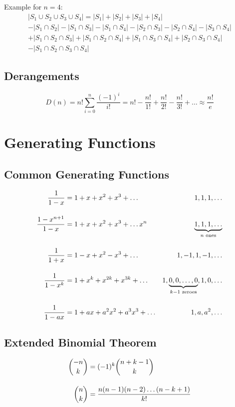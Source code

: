 \documentclass[12pt]{article}
\begin{document}
Example for $n=4:$
\newcommand{\dlist}[1]{S_{#1}}
\begin{multline*}
    |\dlist{1} \cup \dlist{2} \cup \dlist{3} \cup \dlist{4}| = |\dlist{1}| + |\dlist{2}| + |\dlist{3}| + |\dlist{4}|\\ 
    -|\dlist{1} \cap \dlist{2}| - |\dlist{1} \cap \dlist{3}| - |\dlist{1} \cap \dlist{4}| - |\dlist{2} \cap \dlist{3}| - |\dlist{2} \cap \dlist{4}| - |\dlist{3} \cap \dlist{4}|\\
    +|\dlist{1} \cap \dlist{2} \cap \dlist{3}| + |\dlist{1} \cap \dlist{2} \cap \dlist{4}| + |\dlist{1} \cap \dlist{3} \cap \dlist{4}| + |\dlist{2} \cap \dlist{3} \cap \dlist{4}|\\
    -|\dlist{1} \cap \dlist{2} \cap \dlist{3} \cap \dlist{4}|
\end{multline*}
\subsection{Derangements}
\[
    D(n) = n!\sum_{i=0}^n \frac{(-1)^i}{i!} = n! - \frac{n!}{1!} + \frac{n!}{2!} - \frac{n!}{3!} +\ldots \approx \frac{n!}{e}
\]

\pagebreak
\section{Generating Functions}
\subsection{Common Generating Functions}
\begin{equation*}
    \setlength{\jot}{.5cm}
    \begin{aligned}
    \frac{1}{1-x} &= 1 + x + x^2 + x^3 + \ldots & 1, 1, 1, \ldots\\  
    \frac{1-x^{n+1}}{1-x} &= 1 + x + x^2 + x^3 + \ldots x^n & \underbrace{1, 1, 1, \ldots}_{n\text{ ones}}\\
    \frac{1}{1+x} &= 1 - x + x^2 - x^3 + \ldots & 1, -1, 1, -1, \ldots\\  
    \frac{1}{1-x^k} &= 1 + x^k + x^{2k} + x^{3k} + \ldots & 1, \underbrace{0,0,\ldots,0}_{k-1\text{ zeroes}}, 1, 0,\ldots\\
    \frac{1}{1-ax} &= 1 + ax + a^2x^2 + a^3x^3 + \ldots & 1, a, a^2, \ldots\\
    \end{aligned}
\end{equation*}

\subsection{Extended Binomial Theorem}
\begin{equation*}
    \setlength{\jot}{.5cm}
    \begin{aligned}
    \binom{-n}{k} &= (-1)^k\binom{n+k-1}{k}\\
    \binom{n}{k} &= \frac{n(n-1)(n-2)\ldots(n-k+1)}{k!}
    \end{aligned}
\end{equation*}
\end{document}
